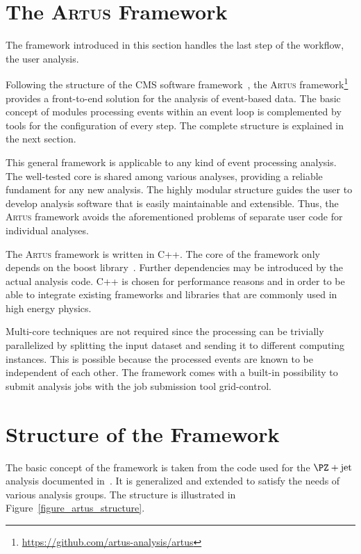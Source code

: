 \documentclass[3p]{elsarticle}
\newcommand{\software}[1]{\textsc{#1}\xspace}
\newcommand{\artus}{\software{Artus}}
\begin{document}
\section{The \artus Framework}
\label{section_artus_motivation}

The framework introduced in this section handles the last step of the workflow, the user analysis.

Following the structure of the CMS software framework~\cite{cms, cmssw}, the \artus framework\footnote{\url{https://github.com/artus-analysis/artus}} provides a front-to-end solution for the analysis of event-based data.
The basic concept of modules processing events within an event loop is complemented by tools for the configuration of every step.
The complete structure is explained in the next section.

This general framework is applicable to any kind of event processing analysis.
The well-tested core is shared among various analyses, providing a reliable fundament for any new analysis.
The highly modular structure guides the user to develop analysis software that is easily maintainable and extensible.
Thus, the \artus framework avoids the aforementioned problems of separate user code for individual analyses.

The \artus framework is written in C++.
The core of the framework only depends on the boost library~\cite{boost}.
Further dependencies may be introduced by the actual analysis code.
C++ is chosen for performance reasons and in order to be able to integrate existing frameworks and libraries that are commonly used in high energy physics.

Multi-core techniques are not required since the processing can be trivially parallelized by splitting the input dataset and sending it to different computing instances.
This is possible because the processed events are known to be independent of each other.
The framework comes with a built-in possibility to submit analysis jobs with the job submission tool grid-control.

\section{Structure of the Framework}
\label{section_artus_structure}

The basic concept of the framework is taken from the code used for the $\PZ+\text{jet}$ analysis documented in~\cite{joram_phd}.
It is generalized and extended to satisfy the needs of various analysis groups.
The structure is illustrated in Figure~\ref{figure_artus_structure}.
\end{document}

